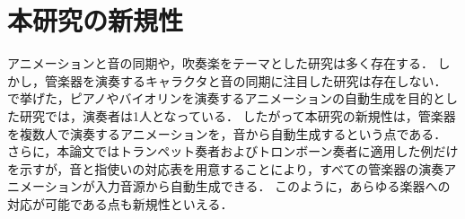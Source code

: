 \section{本研究の新規性}\label{sec:compere}
アニメーションと音の同期や，吹奏楽をテーマとした研究は多く存在する．
しかし，管楽器を演奏するキャラクタと音の同期に注目した研究は存在しない．
で挙げた，ピアノやバイオリンを演奏するアニメーションの自動生成を目的とした研究では，演奏者は1人となっている．
したがって本研究の新規性は，管楽器を複数人で演奏するアニメーションを，音から自動生成するという点である．
さらに，本論文ではトランペット奏者およびトロンボーン奏者に適用した例だけを示すが，音と指使いの対応表を用意することにより，すべての管楽器の演奏アニメーションが入力音源から自動生成できる．
このように，あらゆる楽器への対応が可能である点も新規性といえる．